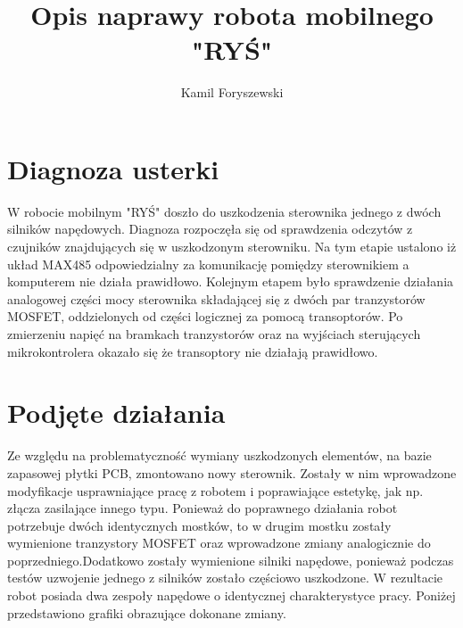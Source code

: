 \documentclass{article}
\title{Opis naprawy robota mobilnego "RYŚ"}
\author{Kamil Foryszewski}
\begin{document}
\maketitle

\section{Diagnoza usterki}
W robocie mobilnym "RYŚ" doszło do uszkodzenia sterownika jednego z dwóch silników napędowych. Diagnoza rozpoczęła się od sprawdzenia odczytów z czujników znajdujących się w uszkodzonym sterowniku. Na tym etapie ustalono iż układ MAX485 odpowiedzialny za komunikację pomiędzy sterownikiem a komputerem nie działa prawidłowo. Kolejnym etapem było sprawdzenie działania analogowej części mocy sterownika składającej się z dwóch par tranzystorów MOSFET, oddzielonych od części logicznej za pomocą transoptorów. Po zmierzeniu napięć na bramkach tranzystorów oraz na wyjściach sterujących mikrokontrolera okazało się że transoptory nie działają prawidłowo. 

\section{Podjęte działania}
Ze względu na problematyczność wymiany uszkodzonych elementów, na bazie zapasowej płytki PCB, zmontowano nowy sterownik. Zostały w nim wprowadzone modyfikacje usprawniające pracę z robotem i poprawiające estetykę, jak np. złącza zasilające innego typu. Ponieważ do poprawnego działania robot potrzebuje dwóch identycznych mostków, to w drugim mostku zostały wymienione tranzystory MOSFET oraz wprowadzone zmiany analogicznie do poprzedniego.Dodatkowo zostały wymienione silniki napędowe, ponieważ podczas testów uzwojenie jednego z silników zostało częściowo uszkodzone. W rezultacie robot posiada dwa zespoły napędowe o identycznej charakterystyce pracy. Poniżej przedstawiono grafiki obrazujące dokonane zmiany. 
\end{document}

